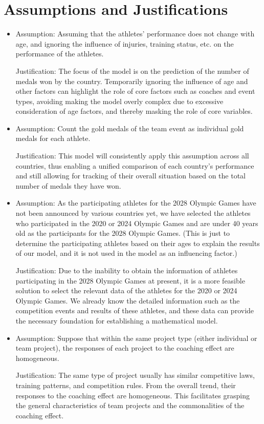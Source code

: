 \documentclass{mcmthesis}  %
\begin{document}
\section{Assumptions and Justifications}  %
\begin{itemize}  %
\item Assumption: Assuming that the athletes' performance does not change with age, and ignoring the influence of injuries, training status, etc. on the performance of the athletes.

Justification: The focus of the model is on the prediction of the number of medals won by the country. Temporarily ignoring the influence of age and other factors can highlight the role of core factors such as coaches and event types, avoiding making the model overly complex due to excessive consideration of age factors, and thereby masking the role of core variables.
\item Assumption: Count the gold medals of the team event as individual gold medals for each athlete.

Justification: This model will consistently apply this assumption across all countries, thus enabling a unified comparison of each country's performance and still allowing for tracking of their overall situation based on the total number of medals they have won.
\item Assumption: As the participating athletes for the 2028 Olympic Games have not been announced by various countries yet, we have selected the athletes who participated in the 2020 or 2024 Olympic Games and are under 40 years old as the participants for the 2028 Olympic Games. (This is just to determine the participating athletes based on their ages to explain the results of our model, and it is not used in the model as an influencing factor.)

Justification: Due to the inability to obtain the information of athletes participating in the 2028 Olympic Games at present, it is a more feasible solution to select the relevant data of the athletes for the 2020 or 2024 Olympic Games. We already know the detailed information such as the competition events and results of these athletes, and these data can provide the necessary foundation for establishing a mathematical model.
\item Assumption: Suppose that within the same project type (either individual or team project), the responses of each project to the coaching effect are homogeneous.

Justification: The same type of project usually has similar competitive laws, training patterns, and competition rules. From the overall trend, their responses to the coaching effect are homogeneous. This facilitates grasping the general characteristics of team projects and the commonalities of the coaching effect.
\end{itemize}  %
\end{document}
